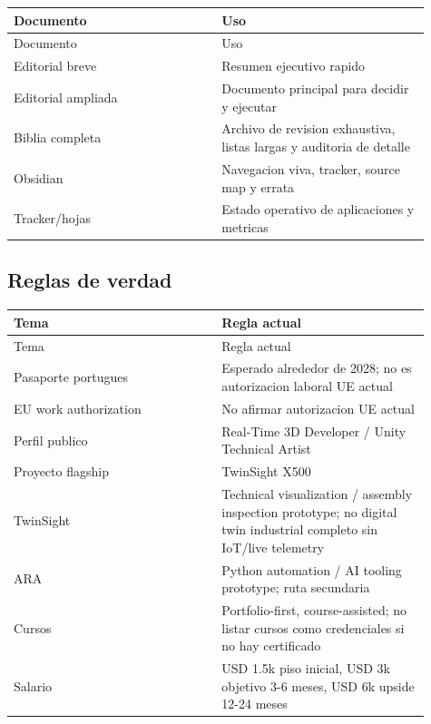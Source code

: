 \begin{center}
\scriptsize
\begin{longtable}{>{\raggedright\arraybackslash}p{0.455\linewidth} >{\raggedright\arraybackslash}p{0.455\linewidth}}
\toprule
Documento & Uso \\
\midrule
\endfirsthead
\toprule
Documento & Uso \\
\midrule
\endhead
Editorial breve & Resumen ejecutivo rapido \\
Editorial ampliada & Documento principal para decidir y ejecutar \\
Biblia completa & Archivo de revision exhaustiva, listas largas y auditoria de detalle \\
Obsidian & Navegacion viva, tracker, source map y errata \\
Tracker/hojas & Estado operativo de aplicaciones y metricas \\
\bottomrule
\end{longtable}
\end{center}


\subsection{Reglas de verdad}


\begin{center}
\scriptsize
\begin{longtable}{>{\raggedright\arraybackslash}p{0.455\linewidth} >{\raggedright\arraybackslash}p{0.455\linewidth}}
\toprule
Tema & Regla actual \\
\midrule
\endfirsthead
\toprule
Tema & Regla actual \\
\midrule
\endhead
Pasaporte portugues & Esperado alrededor de 2028; no es autorizacion laboral UE actual \\
EU work authorization & No afirmar autorizacion UE actual \\
Perfil publico & Real-Time 3D Developer / Unity Technical Artist \\
Proyecto flagship & TwinSight X500 \\
TwinSight & Technical visualization / assembly inspection prototype; no digital twin industrial completo sin IoT/live telemetry \\
ARA & Python automation / AI tooling prototype; ruta secundaria \\
Cursos & Portfolio-first, course-assisted; no listar cursos como credenciales si no hay certificado \\
Salario & USD 1.5k piso inicial, USD 3k objetivo 3-6 meses, USD 6k upside 12-24 meses \\
\bottomrule
\end{longtable}
\end{center}


